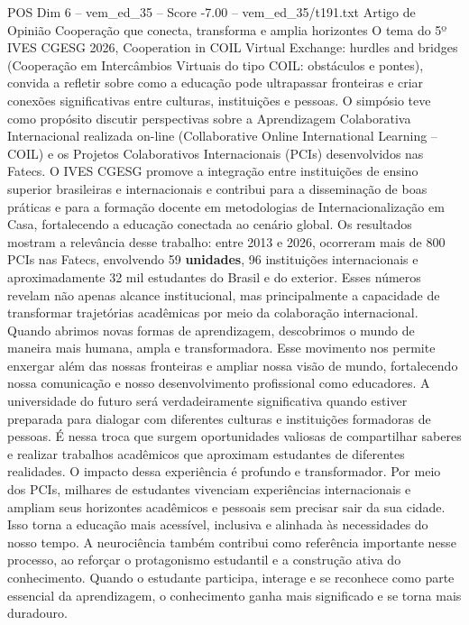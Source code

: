 \begin{textsample}{POS Dim 6 – vem\_ed\_35 – Score -7.00 – vem\_ed\_35/t191.txt}  \label{ex:f6_pos_154}
Artigo de Opinião Cooperação que conecta, transforma e amplia horizontes O tema do 5º IVES CGESG 2026, Cooperation in COIL Virtual Exchange: hurdles and bridges (Cooperação em Intercâmbios Virtuais do tipo COIL: obstáculos e pontes), convida a refletir sobre como a educação pode ultrapassar fronteiras e criar conexões significativas entre culturas, instituições e pessoas.
O simpósio teve como propósito discutir perspectivas sobre a Aprendizagem Colaborativa Internacional realizada on-line (Collaborative Online International Learning – COIL) e os Projetos Colaborativos Internacionais (PCIs) desenvolvidos nas Fatecs.
O IVES CGESG promove a integração entre instituições de ensino superior brasileiras e internacionais e contribui para a disseminação de boas práticas e para a formação docente em metodologias de Internacionalização em Casa, fortalecendo a educação conectada ao cenário global.
Os resultados mostram a relevância desse trabalho: entre 2013 e 2026, ocorreram mais de 800 PCIs nas Fatecs, envolvendo 59 \textbf{unidades}, 96 instituições internacionais e aproximadamente 32 mil estudantes do Brasil e do exterior.
Esses números revelam não apenas alcance institucional, mas principalmente a capacidade de transformar trajetórias acadêmicas por meio da colaboração internacional.
Quando abrimos novas formas de aprendizagem, descobrimos o mundo de maneira mais humana, ampla e transformadora.
Esse movimento nos permite enxergar além das nossas fronteiras e ampliar nossa visão de mundo, fortalecendo nossa comunicação e nosso desenvolvimento profissional como educadores.
A universidade do futuro será verdadeiramente significativa quando estiver preparada para dialogar com diferentes culturas e instituições formadoras de pessoas.
É nessa troca que surgem oportunidades valiosas de compartilhar saberes e realizar trabalhos acadêmicos que aproximam estudantes de diferentes realidades.
O impacto dessa experiência é profundo e transformador.
Por meio dos PCIs, milhares de estudantes vivenciam experiências internacionais e ampliam seus horizontes acadêmicos e pessoais sem precisar sair da sua cidade.
Isso torna a educação mais acessível, inclusiva e alinhada às necessidades do nosso tempo.
A neurociência também contribui como referência importante nesse processo, ao reforçar o protagonismo estudantil e a construção ativa do conhecimento.
Quando o estudante participa, interage e se reconhece como parte essencial da aprendizagem, o conhecimento ganha mais significado e se torna mais duradouro.

\end{textsample}
